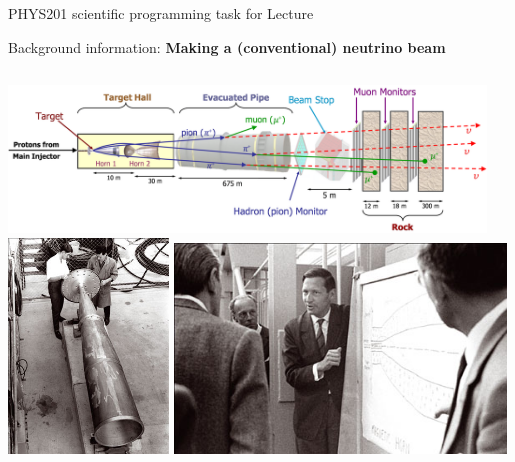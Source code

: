 %
%

{
\programmingslide

%
%
%

\begin{frame}{PHYS201 scientific programming task for Lecture \thislecture}

  Background information: {\bf Making a (conventional) neutrino beam}\\

  \begin{columns}
    \begin{column}{0.78\textwidth}
      \centering
      \includegraphics[width=0.95\textwidth]{./images/schematics/numi.png}\\
      \vspace{0.2cm}
      \includegraphics[width=0.32\textwidth]{./images/photos/beam_horn_old_1.jpg}
      \hfill
      \includegraphics[width=0.66\textwidth]{./images/photos/beam_horn_old_3.jpg}

\end{column}
\end{columns}
\end{frame}}
